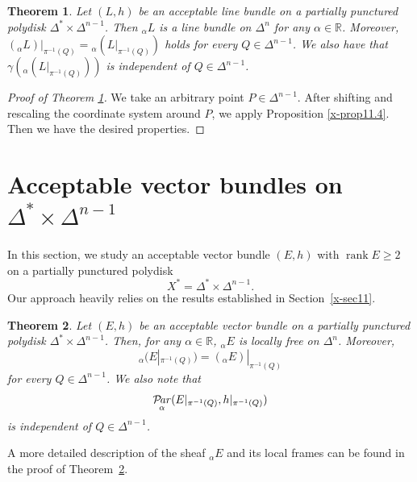 \documentclass[12pt,twoside]{amsart}
\DeclareMathOperator{\rank}{rank}
\DeclareMathOperator{\Par}{\mathcal{P}\!\it{ar}}
\newtheorem{thm}{Theorem}[section]
\theoremstyle{definition}
\begin{document}
\begin{thm}\label{x-thm11.5}
Let $(L, h)$ be an acceptable line bundle on a partially 
punctured polydisk 
$\Delta^*\times \Delta^{n-1}$. 
Then ${}_\alpha L$ is a line 
bundle on $\Delta^n$ for any $\alpha \in \mathbb R$. 
Moreover, $\left({}_\alpha L\right)|_{\pi^{-1}(Q)}={}_{\alpha} 
\left(L|_{\pi^{-1}(Q)}\right)$ holds for every $Q\in \Delta^{n-1}$. 
We also have that $\gamma \left({}_{\alpha} 
\left(L|_{\pi^{-1}(Q)}\right)\right)$ is 
independent of $Q\in \Delta^{n-1}$. 
\end{thm}

\begin{proof}[Proof of Theorem \ref{x-thm11.5}]
We take an arbitrary point $P\in \Delta^{n-1}$. 
After shifting and rescaling the coordinate system around $P$, 
we apply Proposition \ref{x-prop11.4}. 
Then we have the desired properties. 
\end{proof}

\section{Acceptable vector bundles 
on $\Delta^*\times \Delta^{n-1}$}\label{x-sec12}

In this section, we study an acceptable vector bundle $(E,h)$ with
$\rank E\geq2$ on a partially punctured polydisk 
\[
X^*=\Delta^*\times \Delta^{n-1}.
\]
Our approach heavily relies on the results established in
Section~\ref{x-sec11}.

\begin{thm}\label{x-thm12.1}
Let $(E,h)$ be an acceptable vector bundle on a 
partially punctured polydisk $\Delta^*\times \Delta^{n-1}$.
Then, for any $\alpha\in\mathbb R$, ${}_\alpha E$ is locally free on
$\Delta^n$.
Moreover,
\[
{}_\alpha(E|_{\pi^{-1}(Q)})=({}_\alpha E)|_{\pi^{-1}(Q)}
\]
for every $Q\in \Delta^{n-1}$.
We also note that
\[
\Par_\alpha(E|_{\pi^{-1}(Q)},h|_{\pi^{-1}(Q)})
\]
is independent of $Q\in \Delta^{n-1}$.
\end{thm}

A more detailed description of the 
sheaf ${}_\alpha E$ and its local frames
can be found in the proof of Theorem~\ref{x-thm12.1}.
\end{document}
